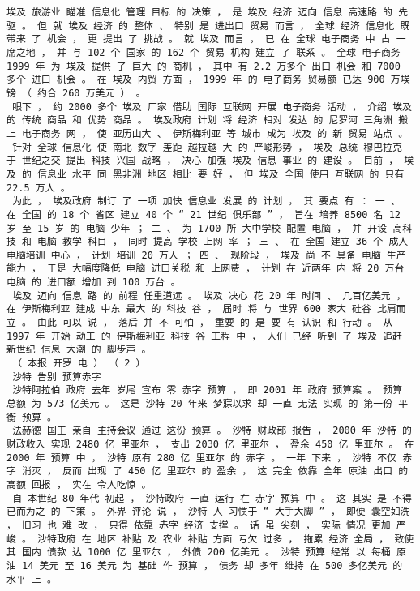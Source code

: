 \documentclass{article}
\begin{document}
\begin{Verbatim}[commandchars=\\\{\}]
 埃及 旅游业 瞄准 信息化 管理 目标 的 决策 ， 是 埃及 经济 迈向 信息 高速路 的 先驱 。 但 就 埃及 经济 的 整体 、 特别 是 进出口 贸易 而言 ， 全球 经济 信息化 既 带来 了 机会 ， 更 提出 了 挑战 。 就 埃及 而言 ， 已 在 全球 电子商务 中 占 一席之地 ， 并 与 102 个 国家 的 162 个 贸易 机构 建立 了 联系 。 全球 电子商务 1999 年 为 埃及 提供 了 巨大 的 商机 ， 其中 有 2.2 万多个 出口 机会 和 7000 多个 进口 机会 。 在 埃及 内贸 方面 ， 1999 年 的 电子商务 贸易额 已达 900 万埃镑 （ 约合 260 万美元 ） 。 
 眼下 ， 约 2000 多个 埃及 厂家 借助 国际 互联网 开展 电子商务 活动 ， 介绍 埃及 的 传统 商品 和 优势 商品 。 埃及政府 计划 将 经济 相对 发达 的 尼罗河 三角洲 搬上 电子商务 网 ， 使 亚历山大 、 伊斯梅利亚 等 城市 成为 埃及 的 新 贸易 站点 。 
 针对 全球 信息化 使 南北 数字 差距 越拉越 大 的 严峻形势 ， 埃及 总统 穆巴拉克 于 世纪之交 提出 科技 兴国 战略 ， 决心 加强 埃及 信息 事业 的 建设 。 目前 ， 埃及 的 信息业 水平 同 黑非洲 地区 相比 要 好 ， 但 埃及 全国 使用 互联网 的 只有 22.5 万人 。 
 为此 ， 埃及政府 制订 了 一项 加快 信息业 发展 的 计划 ， 其 要点 有 ： 一 、 在 全国 的 18 个 省区 建立 40 个 “ 21 世纪 俱乐部 ” ， 旨在 培养 8500 名 12 岁 至 15 岁 的 电脑 少年 ； 二 、 为 1700 所 大中学校 配置 电脑 ， 并 开设 高科技 和 电脑 教学 科目 ， 同时 提高 学校 上网 率 ； 三 、 在 全国 建立 36 个 成人 电脑培训 中心 ， 计划 培训 20 万人 ； 四 、 现阶段 ， 埃及 尚 不 具备 电脑 生产能力 ， 于是 大幅度降低 电脑 进口关税 和 上网费 ， 计划 在 近两年 内 将 20 万台 电脑 的 进口额 增加 到 100 万台 。 
 埃及 迈向 信息 路 的 前程 任重道远 。 埃及 决心 花 20 年 时间 、 几百亿美元 ， 在 伊斯梅利亚 建成 中东 最大 的 科技 谷 ， 届时 将 与 世界 600 家大 硅谷 比肩而立 。 由此 可以 说 ， 落后 并 不 可怕 ， 重要 的 是 要 有 认识 和 行动 。 从 1997 年 开始 动工 的 伊斯梅利亚 科技 谷 工程 中 ， 人们 已经 听到 了 埃及 追赶 新世纪 信息 大潮 的 脚步声 。 
 （ 本报 开罗 电 ） （ 2 ） 
 沙特 告别 预算赤字 
 沙特阿拉伯 政府 去年 岁尾 宣布 零 赤字 预算 ， 即 2001 年 政府 预算案 。 预算 总额 为 573 亿美元 。 这是 沙特 20 年来 梦寐以求 却 一直 无法 实现 的 第一份 平衡 预算 。 
 法赫德 国王 亲自 主持会议 通过 这份 预算 。 沙特 财政部 报告 ， 2000 年 沙特 的 财政收入 实现 2480 亿 里亚尔 ， 支出 2030 亿 里亚尔 ， 盈余 450 亿 里亚尔 。 在 2000 年 预算 中 ， 沙特 原有 280 亿 里亚尔 的 赤字 。 一年 下来 ， 沙特 不仅 赤字 消灭 ， 反而 出现 了 450 亿 里亚尔 的 盈余 ， 这 完全 依靠 全年 原油 出口 的 高额 回报 ， 实在 令人吃惊 。 
 自 本世纪 80 年代 初起 ， 沙特政府 一直 运行 在 赤字 预算 中 。 这 其实 是 不得已而为之 的 下策 。 外界 评论 说 ， 沙特 人 习惯于 “ 大手大脚 ” ， 即便 囊空如洗 ， 旧习 也 难 改 ， 只得 依靠 赤字 经济 支撑 。 话 虽 尖刻 ， 实际 情况 更加 严峻 。 沙特政府 在 地区 补贴 及 农业 补贴 方面 亏欠 过多 ， 拖累 经济 全局 ， 致使 其 国内 债款 达 1000 亿 里亚尔 ， 外债 200 亿美元 。 沙特 预算 经常 以 每桶 原油 14 美元 至 16 美元 为 基础 作 预算 ， 债务 却 多年 维持 在 500 多亿美元 的 水平 上 。 

\end{Verbatim}
\end{document}
